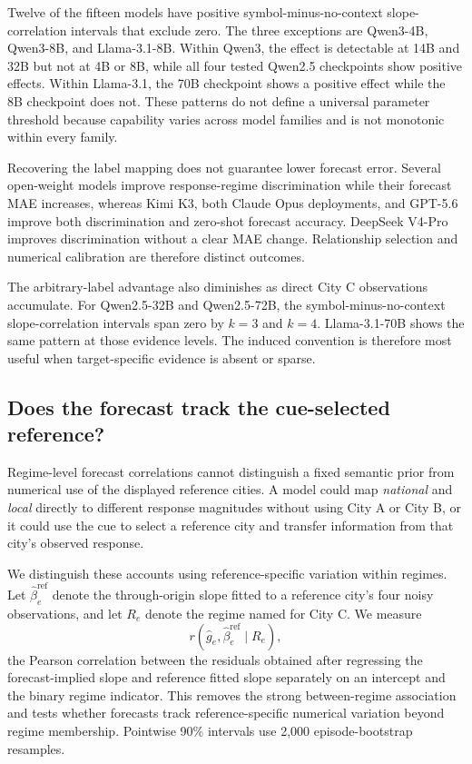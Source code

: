 Twelve of the fifteen models have positive symbol-minus-no-context slope-correlation intervals that exclude zero.
The three exceptions are Qwen3-4B, Qwen3-8B, and Llama-3.1-8B.
Within Qwen3, the effect is detectable at 14B and 32B but not at 4B or 8B, while all four tested Qwen2.5 checkpoints show positive effects.
Within Llama-3.1, the 70B checkpoint shows a positive effect while the 8B checkpoint does not.
These patterns do not define a universal parameter threshold because capability varies across model families and is not monotonic within every family.

Recovering the label mapping does not guarantee lower forecast error.
Several open-weight models improve response-regime discrimination while their forecast MAE increases, whereas Kimi K3, both Claude Opus deployments, and GPT-5.6 improve both discrimination and zero-shot forecast accuracy.
DeepSeek V4-Pro improves discrimination without a clear MAE change.
Relationship selection and numerical calibration are therefore distinct outcomes.

The arbitrary-label advantage also diminishes as direct City C observations accumulate.
For Qwen2.5-32B and Qwen2.5-72B, the symbol-minus-no-context slope-correlation intervals span zero by \(k=3\) and \(k=4\).
Llama-3.1-70B shows the same pattern at those evidence levels.
The induced convention is therefore most useful when target-specific evidence is absent or sparse.

\subsection{Does the forecast track the cue-selected reference?}
\label{app:coin-city-reference-selection}

Regime-level forecast correlations cannot distinguish a fixed semantic prior from numerical use of the displayed reference cities.
A model could map \emph{national} and \emph{local} directly to different response magnitudes without using City A or City B, or it could use the cue to select a reference city and transfer information from that city's observed response.

We distinguish these accounts using reference-specific variation within regimes.
Let \(\widehat\beta^{\mathrm{ref}}_e\) denote the through-origin slope fitted to a reference city's four noisy observations, and let \(R_e\) denote the regime named for City C.
We measure
\[
r\!\left(
\widehat g_e,
\widehat\beta^{\mathrm{ref}}_e
\mid
R_e
\right),
\]
the Pearson correlation between the residuals obtained after regressing the forecast-implied slope and reference fitted slope separately on an intercept and the binary regime indicator.
This removes the strong between-regime association and tests whether forecasts track reference-specific numerical variation beyond regime membership.
Pointwise 90\% intervals use 2,000 episode-bootstrap resamples.

